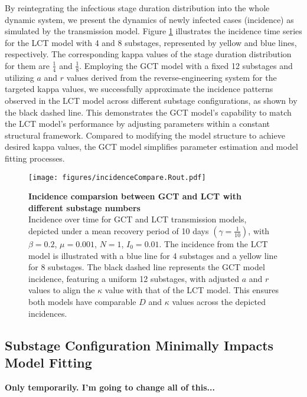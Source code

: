 \documentclass[12pt]{article}
\begin{document}
By reintegrating the infectious stage duration distribution into the whole dynamic system, we present the dynamics of newly infected cases (incidence) as simulated by the transmission model. Figure \ref{incidenceCompare} illustrates the incidence time series for the LCT model with 4 and 8 substages, represented by yellow and blue lines, respectively. The corresponding kappa values of the stage duration distribution for them are $\frac{1}{4}$ and $\frac{1}{8}$. Employing the GCT model with a fixed 12 substages and utilizing $a$ and $r$ values derived from the reverse-engineering system for the targeted kappa values, we successfully approximate the incidence patterns observed in the LCT model across different substage configurations, as shown by the black dashed line. This demonstrates the GCT model's capability to match the LCT model's performance by adjusting parameters within a constant structural framework. Compared to modifying the model structure to achieve desired kappa values, the GCT model simplifies parameter estimation and model fitting processes. 

\begin{figure}[h!]
    \centering
    \texttt{[image: figures/incidenceCompare.Rout.pdf]}
    \caption{\textbf{Incidence comparsion between GCT and LCT with different substage numbers} \\ Incidence over time for GCT and LCT transmission models, depicted under a mean recovery period of 10 days $(\gamma = \frac{1}{10})$, with $\beta=0.2$, $\mu=0.001$, $N=1$, $I_0=0.01$. The incidence from the LCT model is illustrated with a blue line for 4 substages and a yellow line for 8 substages. The black dashed line represents the GCT model incidence, featuring a uniform 12 substages, with adjusted $a$ and $r$ values to align the $\kappa$ value with that of the LCT model. This ensures both models have comparable $D$ and $\kappa$ values across the depicted incidences.}
    \label{incidenceCompare}
\end{figure}


\subsection{Substage Configuration Minimally Impacts Model Fitting}
\textbf{Only temporarily. I'm going to change all of this...}
\end{document}
